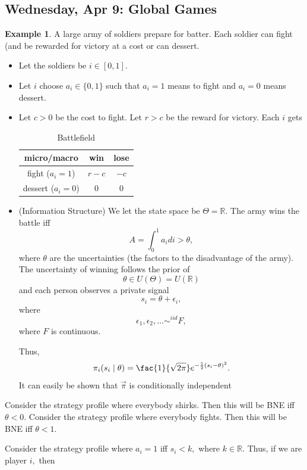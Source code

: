\documentclass[10pt, oneside]{article}
\newcommand{\bbR}{\mathbb{R}}
\theoremstyle{definition}
\newtheorem{exmp}{Example}[section]
\begin{document}
 \newpage
 \subsection{Wednesday, Apr 9: Global Games}
 \begin{exmp}
     A large army of soldiers prepare for batter. Each soldier can fight (and be rewarded for victory at a cost or can dessert. 
     \begin{itemize}
         \item Let the soldiers be $i \in [0,1].$
         \item Let $i$ choose $a_i \in \{0,1\}$ such that $a_i = 1$ means to fight and $a_i = 0$ means dessert. 
         \item 
         Let $c>0$ be the cost to fight. Let $r>c$ be the reward for victory. Each $i$ gets
             \begin{table}[H]
        \centering
        \begin{tabular}{c|c|c}
            micro/macro & win & lose\\
             \hline
             fight ($a_i = 1$)& $r -c$ & $-c$ \\
             \hline
             dessert ($a_i = 0$)&  $0$& $0$\\
        \end{tabular}
        \caption{Battlefield}
    \end{table}
     \item (Information Structure) We let the state space be $\Theta = \bbR.$ The army wins the battle iff 
     \[A = \int_0^1 a_i di >\theta,\] where $\theta$ are the uncertainties (the factors to the disadvantage of the army). The uncertainty of winning follows the prior of
     \[\theta \in U(\Theta) = U(\bbR)\] and each person observes a private signal 
     \[s_i = \theta + \epsilon_i,\] where 
     \[\epsilon_1, \epsilon_2, \dots \sim^{iid} F,\] where $F$ is continuous.

     Thus, 
     \[\pi_i(s_i \mid \theta) = \fac{1}{\sqrt{2\pi}}e^{-\frac{1}{2}(s_i -\theta)^2}.\] It can easily be shown that $\Vec{\pi}$ is conditionally independent 
         \end{itemize}
Consider the strategy profile where everybody shirks. Then this will be BNE iff $\theta <0.$ Consider the strategy profile where everybody fights. Then this will be BNE iff $\theta <1.$

Consider the strategy profile where $a_i = 1$ iff $s_i < k,$ where $k \in \bbR.$ Thus, if we are player $i,$ then 


\end{exmp}
\end{document}
